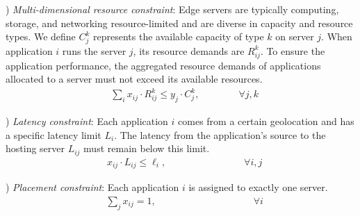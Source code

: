 ) \textit{Multi-dimensional resource constraint}:  Edge servers are typically computing, storage, and networking resource-limited and are diverse in capacity and resource types. We define $C_j^k$ represents the available capacity of type $k$ on server $j$. When application $i$ runs the server $j$, its resource demands are $R_{ij}^k$. To ensure the application performance, the aggregated resource demands of applications allocated to a server must not exceed its available resources. 
{\small 
\begin{align}
    \label{eq:comp_cap}
    & \sum_i x_{ij} \cdot R_{ij}^k \leq y_j \cdot C_j^{k}, \quad \quad \quad \quad  \forall j, k 
\end{align}
}

) \textit{Latency constraint}: Each application $i$ comes from a certain geolocation and has a specific latency limit $L_i$. The latency from the application's source to the hosting server $L_{ij}$ must remain below this limit. 
{\small 
\begin{align}
    \label{eq:latency}
    & x_{ij} \cdot L_{ij} \leq \ell_i, \quad \quad \quad \quad \quad \quad \quad \quad \forall i, j 
\end{align}
}

) \textit{Placement constraint}: Each application $i$ is assigned to exactly one server. 
{\small 
\begin{align}
    \label{eq:placement}
    & \sum_j x_{ij} = 1, \quad \quad \quad \quad \quad  \quad \quad \quad \quad \quad \forall i 
\end{align}
}

